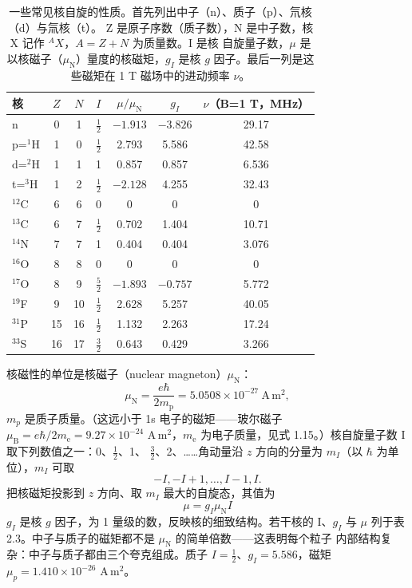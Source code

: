 \begin{table}
\centering
\caption{一些常见核自旋的性质。首先列出中子（n）、质子（p）、氘核（d）与氚核（t）。
Z 是原子序数（质子数），N 是中子数，核 X 记作 ${}^{A}X$，$A=Z+N$ 为质量数。I 是核
自旋量子数，$\mu$ 是以核磁子（$\mu_{\mathrm{N}}$）量度的核磁矩，$g_I$ 是核 $g$
因子。最后一列是这些磁矩在 1 T 磁场中的进动频率 $\nu$。}
\small
\begin{tabular}{lcccccc}
\toprule
核 & $Z$ & $N$ & $I$ & $\mu/\mu_{\mathrm{N}}$ & $g_I$ & $\nu$（B=1 T，MHz）\\
\midrule
n & 0 & 1 & $\frac{1}{2}$ & $-1.913$ & $-3.826$ & 29.17\\
p=${}^{1}$H & 1 & 0 & $\frac{1}{2}$ & 2.793 & 5.586 & 42.58\\
d=${}^{2}$H & 1 & 1 & 1 & 0.857 & 0.857 & 6.536\\
t=${}^{3}$H & 1 & 2 & $\frac{1}{2}$ & $-2.128$ & 4.255 & 32.43\\
${}^{12}$C & 6 & 6 & 0 & 0 & 0 & 0\\
${}^{13}$C & 6 & 7 & $\frac{1}{2}$ & 0.702 & 1.404 & 10.71\\
${}^{14}$N & 7 & 7 & 1 & 0.404 & 0.404 & 3.076\\
${}^{16}$O & 8 & 8 & 0 & 0 & 0 & 0\\
${}^{17}$O & 8 & 9 & $\frac{5}{2}$ & $-1.893$ & $-0.757$ & 5.772\\
${}^{19}$F & 9 & 10 & $\frac{1}{2}$ & 2.628 & 5.257 & 40.05\\
${}^{31}$P & 15 & 16 & $\frac{1}{2}$ & 1.132 & 2.263 & 17.24\\
${}^{33}$S & 16 & 17 & $\frac{3}{2}$ & 0.643 & 0.429 & 3.266\\
\bottomrule
\end{tabular}
\end{table}

核磁性的单位是核磁子（nuclear magneton）$\mu_{\mathrm{N}}$：
\begin{equation*}
\mu_{\mathrm{N}} = \frac{e\hbar}{2m_{\mathrm{p}}} = 5.0508\times10^{-27}\ \mathrm{A\,m^{2}},\tag{2.61}
\end{equation*}
$m_p$ 是质子质量。（这远小于 1s 电子的磁矩——玻尔磁子
$\mu_{\mathrm{B}}=e\hbar/2m_{\mathrm{e}}=9.27\times10^{-24}$ A\,m$^2$，$m_{\mathrm{e}}$
为电子质量，见式 1.15。）核自旋量子数 I 取下列数值之一：0、$\frac{1}{2}$、1、
$\frac{3}{2}$、2、……角动量沿 $z$ 方向的分量为 $m_I$（以 $\hbar$ 为单位），$m_I$
可取
\begin{equation*}
-I, -I+1, \dots, I-1, I.\tag{2.62}
\end{equation*}
把核磁矩投影到 $z$ 方向、取 $m_I$ 最大的自旋态，其值为
\begin{equation*}
\mu = g_I\mu_{\mathrm{N}}I\tag{2.63}
\end{equation*}
$g_I$ 是核 $g$ 因子，为 1 量级的数，反映核的细致结构。若干核的 I、$g_I$ 与 $\mu$
列于表 2.3。中子与质子的磁矩都不是 $\mu_{\mathrm{N}}$ 的简单倍数——这表明每个粒子
内部结构复杂：中子与质子都由三个夸克组成。质子 $I=\frac{1}{2}$、$g_I=5.586$，磁矩
$\mu_p=1.410\times10^{-26}$ A\,m$^2$。

